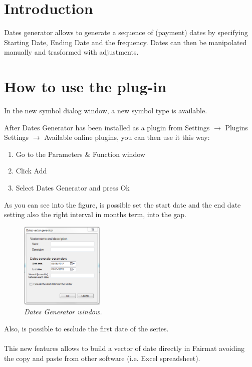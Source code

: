 \newcommand{\pluginName}{Dates Generator}
\newcommand{\pluginVersion}{1.0}




\section{Introduction}
Dates generator allows to generate a sequence of (payment) dates by specifying Starting Date, Ending Date and the frequency.  Dates can then be manipolated manually and trasformed with adjustments.
\section{How to use the plug-in}
In the new symbol dialog window, a new symbol type is available.

After Dates Generator has been installed as a plugin from Settings $\to$ Plugins Settings 
$\to$ Available online plugins, you can then use it this way: 
\begin{enumerate}
\item Go to the Parameters \& Function window
\item Click Add
\item Select Dates Generator and press Ok
\end{enumerate}
As you can see into the figure\label{fig:DG}, is possible set the start date and the end date setting also the right interval in months term, into the gap. 
\begin{figure}[h!]
\includegraphics[width=4cm]{DG_img}
\centering
\caption{\small{\emph{Dates Generator window.}}}
\label{fig:DG}
\end{figure}
Also, is possible to esclude the first date of the series.\\
\\
This new features allows to build a vector of date directly in Fairmat avoiding the 
copy and paste from other software (i.e. Excel spreadsheet).


